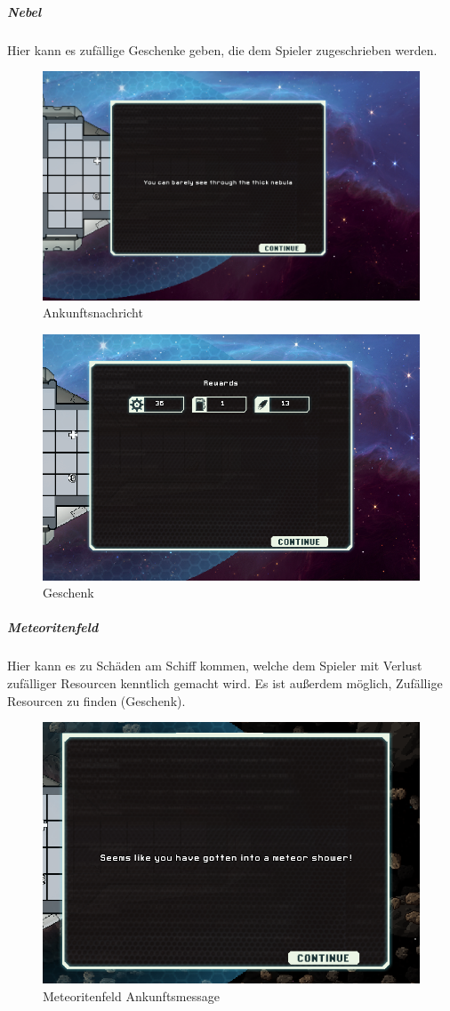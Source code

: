 \documentclass[fontsize=12pt,paper=a4,twoside]{scrartcl}
\begin{document}
\subparagraph{Nebel} Hier kann es zufällige Geschenke geben, die dem Spieler zugeschrieben werden.

\begin{figure}[H]
\centering
\includegraphics[width=0.8\linewidth]{DasSpiel/Karte/nebular.png}
\caption{Ankunftsnachricht}
\end{figure} 


\begin{figure}[H]
\centering
\includegraphics[width=0.8\linewidth]{DasSpiel/Karte/nebularPresent.png}
\caption{Geschenk}
\end{figure} 

\subparagraph{Meteoritenfeld} Hier kann es zu Schäden am Schiff kommen, welche dem Spieler mit Verlust zufälliger Resourcen kenntlich gemacht wird. Es ist außerdem möglich, Zufällige Resourcen zu finden (Geschenk).

\begin{figure}[H]
\centering
\includegraphics[width=1\linewidth]{DasSpiel/Karte/meteor.png}
\caption{Meteoritenfeld Ankunftsmessage}
\end{figure} 
\end{document}
